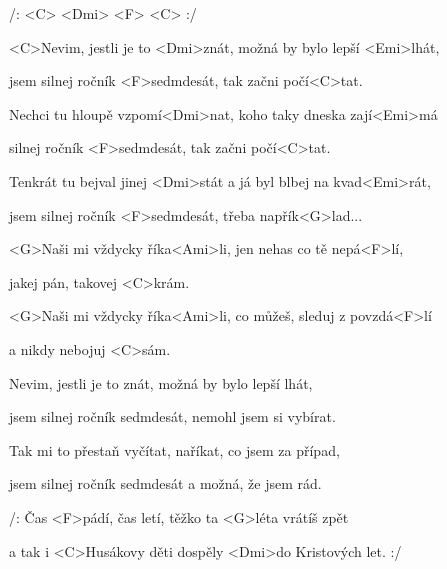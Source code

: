 

/: <C> <Dmi> <F> <C> :/

\zs

<C>Nevim, jestli je to <Dmi>znát,
možná by bylo lepší <Emi>lhát,

jsem silnej ročník <F>sedmdesát, tak začni počí<C>tat.

Nechci tu hloupě vzpomí<Dmi>nat, koho taky dneska zají<Emi>má

silnej ročník <F>sedmdesát, tak začni počí<C>tat.

Tenkrát tu bejval jinej <Dmi>stát a já byl blbej na kvad<Emi>rát,

jsem silnej ročník <F>sedmdesát, třeba napřík<G>lad...
\ks

\zr
<G>Naši mi vždycky říka<Ami>li, jen nehas co tě nepá<F>lí,

jakej pán, takovej <C>krám.

<G>Naši mi vždycky říka<Ami>li, co můžeš, sleduj z povzdá<F>lí

a nikdy nebojuj <C>sám.
\kr

\zs
Nevim, jestli je to znát, možná by bylo lepší lhát,

jsem silnej ročník sedmdesát, nemohl jsem si vybírat.

Tak mi to přestaň vyčítat, naříkat, co jsem za případ,

jsem silnej ročník sedmdesát a možná, že jsem rád.
\ks

\zr

\kr


\zs
/: Čas <F>pádí, čas letí, těžko ta <G>léta vrátíš zpět

a tak i <C>Husákovy děti dospěly <Dmi>do Kristových let. :/
\ks

\kp
